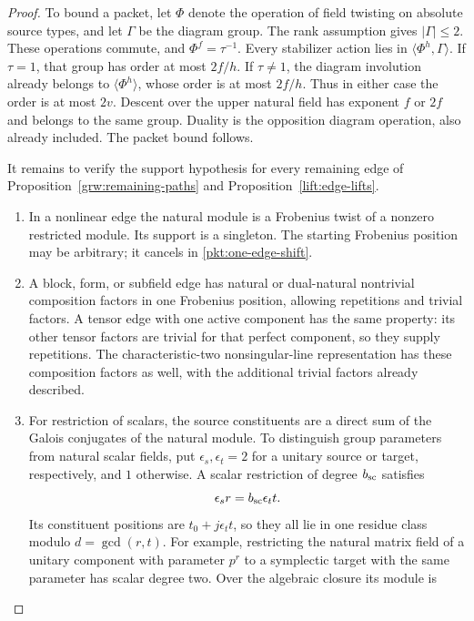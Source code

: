 \begin{proof}
To bound a packet, let $\Phi$ denote the operation of field twisting on
absolute source types, and let $\Gamma$ be the diagram group.
The rank assumption gives $|\Gamma|\le2$.  These operations
commute, and $\Phi^f=\tau^{-1}$.  Every stabilizer action lies
in $\langle\Phi^h,\Gamma\rangle$.  If $\tau=1$, that group has
order at most $2f/h$.  If $\tau\ne1$, the diagram involution
already belongs to $\langle\Phi^h\rangle$, whose order is at
most $2f/h$.  Thus in either case the order is at most $2v$.
Descent over the upper natural field has exponent $f$ or $2f$
and belongs to the same group.  Duality is the opposition
diagram operation, also already included.  The packet bound
follows.

It remains to verify the support hypothesis for every remaining edge of
Proposition~\ref{grw:remaining-paths} and
Proposition~\ref{lift:edge-lifts}.
\begin{enumerate}[label=\textup{(\alph*)}]
\item In a nonlinear edge the natural module is a Frobenius
      twist of a nonzero restricted module.  Its support is
      a singleton.  The starting Frobenius position may be
      arbitrary; it cancels in
      \eqref{pkt:one-edge-shift}.
\item A block, form, or subfield edge has natural or dual-natural
      nontrivial composition factors in one Frobenius position,
      allowing repetitions and trivial factors.  A tensor edge
      with one active component has the same property: its
      other tensor factors are trivial for that perfect
      component, so they supply repetitions.  The
      characteristic-two nonsingular-line representation has
      these composition factors as well, with the additional
      trivial factors already described.
\item For restriction of scalars, the source constituents are
      a direct sum of the Galois conjugates of the natural
      module.  To distinguish group parameters from natural
      scalar fields, put $\epsilon_s,\epsilon_t=2$ for a
      unitary source or target, respectively, and $1$
      otherwise.  A scalar restriction of degree $b_{\rm sc}$
      satisfies
      \[
          \epsilon_s r=b_{\rm sc}\epsilon_t t.
      \]
      Its constituent positions are
      $t_0+j\epsilon_t t$, so they all lie in one residue
      class modulo $d=\gcd(r,t)$.
      For example, restricting the natural matrix field of a
      unitary component with parameter $p^r$ to a symplectic
      target with the same parameter has scalar degree two.
      Over the algebraic closure its module is

\end{enumerate}
\end{proof}
